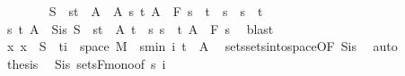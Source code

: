 \begin{isabellebody}
\isanewline
\ \ \ \ \ \ \isamarkupfalse%
\ {\isachardoublequoteopen}S\ {\isasymin}\ {\isacharbraceleft}{\kern0pt}{\isacharbraceleft}{\kern0pt}s{\isacharless}{\kern0pt}{\isachardot}{\kern0pt}{\isachardot}{\kern0pt}t{\isacharbraceright}{\kern0pt}\ {\isasymtimes}\ A\ {\isacharbar}{\kern0pt}\ A\ s\ t{\isachardot}{\kern0pt}\ A\ {\isasymin}\ F\ s\ {\isasymand}\ t\ {\isasymle}\ s\ {\isasymand}\ s\ {\isacharless}{\kern0pt}\ t{\isacharbraceright}{\kern0pt}{\isachardoublequoteclose}\isanewline
\ \ \ \ \ \ \isamarkupfalse%
\ \isamarkupfalse%
\ s\ t\ A\ \ S{\isacharunderscore}{\kern0pt}is{\isacharcolon}{\kern0pt}\ {\isachardoublequoteopen}S\ {\isacharequal}{\kern0pt}\ {\isacharbraceleft}{\kern0pt}s{\isacharless}{\kern0pt}{\isachardot}{\kern0pt}{\isachardot}{\kern0pt}t{\isacharbraceright}{\kern0pt}\ {\isasymtimes}\ A{\isachardoublequoteclose}\ {\isachardoublequoteopen}t\ {\isasymle}\ s{\isachardoublequoteclose}\ {\isachardoublequoteopen}s\ {\isacharless}{\kern0pt}\ t{\isachardoublequoteclose}\ {\isachardoublequoteopen}A\ {\isasymin}\ F\ s{\isachardoublequoteclose}\ \isamarkupfalse%
\ blast\isanewline
\ \ \ \ \ \ \isamarkupfalse%
\ {\isachardoublequoteopen}{\isacharparenleft}{\kern0pt}{\isasymlambda}x{\isachardot}{\kern0pt}\ x{\isacharparenright}{\kern0pt}\ {\isacharminus}{\kern0pt}{\isacharbackquote}{\kern0pt}\ S\ {\isasyminter}\ {\isacharparenleft}{\kern0pt}{\isacharbraceleft}{\kern0pt}ti{\isacharbraceright}{\kern0pt}\ {\isasymtimes}\ space\ M{\isacharparenright}{\kern0pt}\ {\isacharequal}{\kern0pt}\ {\isacharbraceleft}{\kern0pt}s{\isacharless}{\kern0pt}{\isachardot}{\kern0pt}{\isachardot}{\kern0pt}min\ i\ t{\isacharbraceright}{\kern0pt}\ {\isasymtimes}\ A{\isachardoublequoteclose}\ \isamarkupfalse%
\ sets{\isachardot}{\kern0pt}sets{\isacharunderscore}{\kern0pt}into{\isacharunderscore}{\kern0pt}space{\isacharbrackleft}{\kern0pt}OF\ S{\isacharunderscore}{\kern0pt}is{\isacharparenleft}{\kern0pt}{}{\isacharparenright}{\kern0pt}{\isacharbrackright}{\kern0pt}\ \isamarkupfalse%
\ auto\isanewline
\ \ \ \ \ \ \isamarkupfalse%
\ \isamarkupfalse%
\ {\isacharquery}{\kern0pt}thesis\ \isamarkupfalse%
\ S{\isacharunderscore}{\kern0pt}is\ sets{\isacharunderscore}{\kern0pt}F{\isacharunderscore}{\kern0pt}mono{\isacharbrackleft}{\kern0pt}of\ s\ i{\isacharbrackright}{\kern0pt}\ \isamarkupfalse%

\end{isabellebody}
